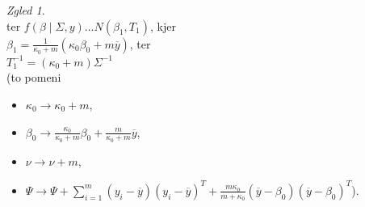 \documentclass[a4paper, 12pt]{book}
\theoremstyle{definition}
\theoremstyle{remark}
\newtheorem*{exmp}{Zgled}
\begin{document}
\begin{itemize}
\begin{exmp}
\begin{equation*}
            \end{equation*}
            ter $f(\beta \mid \Sigma, y) \dots N(\beta_1, T_1)$, kjer \\
            $\beta_1 = \frac{1}{\kappa_0 + m} (\kappa_0 \beta_0 + m \overline{y})$, ter \\
            $T_1^{-1} = (\kappa_0 + m) \Sigma^{-1}$ \\
            (to pomeni
            \begin{itemize}[label={}]
                \item $\kappa_0 \to \kappa_0 + m$,
                \item $\beta_0 \to \frac{\kappa_0}{\kappa_0 + m} \beta_0 + \frac{m}{\kappa_0 + m}{\overline{y}}$,
                \item $\nu \to \nu + m$,
                \item $\Psi \to \Psi + \sum_{i=1}^m (y_i - \overline{y}) (y_i - \overline{y})^T
                    + \frac{m \kappa_0}{m + \kappa_0} (\overline{y} - \beta_0) (\overline{y} - \beta_0)^T$).
            \end{itemize}
        \end{exmp}
\end{itemize}



%
%



\end{document}
